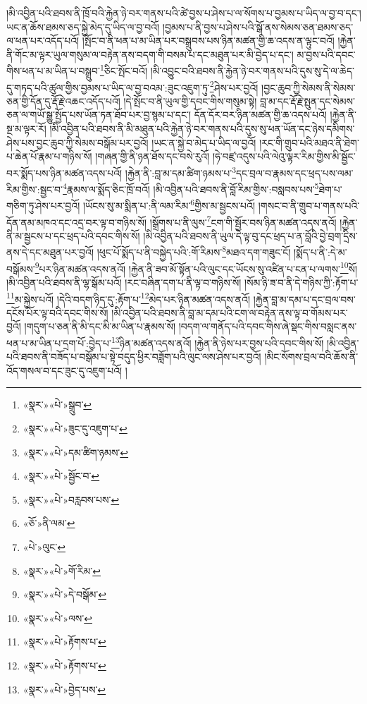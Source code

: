 །མི་འབྱིན་པའི་ཐབས་ནི་ཁྲོ་བའི་རྐྱེན་ཉེ་བར་གནས་པའི་ཚེ་བྱས་པ་ཤེས་པ་ལ་སོགས་པ་བྱམས་པ་ཡིད་ལ་བྱ་བ་དང་། ཡང་ན་ཆོས་ཐམས་ཅད་སྐྱེ་མེད་དུ་ཡིད་ལ་བྱ་བའོ། །བྱམས་པ་ནི་བྱས་པ་ཤེས་པའི་སྒོ་ནས་སེམས་ཅན་ཐམས་ཅད་ལ་ཕན་པར་འདོད་པའོ། །སྤོང་བ་ནི་ཕན་པ་མ་ཡིན་པར་བསྒྲུབས་པས་ཉིན་མཚན་གྱི་ཆ་འདས་ན་ལྟུང་བའོ། །རྐྱེན་ནི་གོང་མ་ལྟར་ཡུལ་གསུམ་ལ་བརྟེན་ནས་བདག་གི་བསམ་པ་དང་མཐུན་པར་མི་བྱེད་པ་དང་། མ་བྱས་པའི་དབང་གིས་ཕན་པ་མ་ཡིན་པ་བསྒྲུབ་\footnote{«སྣར་»«པེ་»སྒྲུབ་}ཅིང་སྤོང་བའོ། །མི་འབྱུང་བའི་ཐབས་ནི་རྐྱེན་ཉེ་བར་གནས་པའི་དུས་སུ་དེ་ལ་ཆེད་དུ་གཏད་པའི་ཚུལ་གྱིས་བྱམས་པ་ཡིད་ལ་བྱ་བའམ་:ཟུང་འཇུག་ཏུ་\footnote{«སྣར་»«པེ་»ཟུང་དུ་འཇུག་པ་}ཤེས་པར་བྱའོ། །བྱང་ཆུབ་ཀྱི་སེམས་ནི་སེམས་ཅན་གྱི་དོན་དུ་རྡོ་རྗེ་འཆང་འདོད་པའོ། །དེ་སྤོང་བ་ནི་ཡུལ་གྱི་དབང་གིས་གསུམ་སྟེ། བླ་མ་དང་རྡོ་རྗེ་སྤུན་དང་སེམས་ཅན་ལ་གཡོ་སྒྱུ་སྤྱོད་པས་ཡོན་ཏན་ཐོབ་པར་བྱ་སྙམ་པ་དང་། དོན་དོར་བར་ཉིན་མཚན་གྱི་ཆ་འདས་པའོ། །རྐྱེན་ནི་སྔ་མ་ལྟར་རོ། །མི་འབྱིན་པའི་ཐབས་ནི་མི་མཐུན་པའི་རྐྱེན་ཉེ་བར་གནས་པའི་དུས་སུ་ཕན་ཡོན་དང་ཉེས་དམིགས་ཤེས་པས་བྱང་ཆུབ་ཀྱི་སེམས་བསྒོམ་པར་བྱའོ། །ཡང་ན་སྐྱེ་བ་མེད་པ་ཡིད་ལ་བྱའོ། །རང་གི་གྲུབ་པའི་མཐའ་ནི་ཐེག་པ་ཆེན་པོ་རྣམ་པ་གཉིས་སོ། །གཞན་གྱི་ནི་ཉན་ཐོས་དང་བསེ་རུའོ། །ཧེ་བཛྲ་འདུས་པའི་ལེའུ་ལྟར་རིམ་གྱིས་མི་སྦྱོང་བར་སྨོད་པས་ཉིན་མཚན་འདས་པའོ། །རྐྱེན་ནི་:བླ་མ་དམ་ཚིག་ཉམས་པ་\footnote{«སྣར་»«པེ་»དམ་ཚིག་ཉམས་}དང་བྲལ་བ་རྣམས་དང་ཕྲད་པས་ལམ་རིམ་གྱིས་:སྦྱང་བ་\footnote{«སྣར་»«པེ་»སྦྱོང་བ་}རྣམས་ལ་སྨོད་ཅིང་ཁྲོ་བའོ། །མི་འབྱིན་པའི་ཐབས་ནི་བློ་རིམ་གྱིས་:བསླབས་པས་\footnote{«སྣར་»«པེ་»བརླབས་པས་}ཐེག་པ་གཅིག་ཏུ་ཤེས་པར་བྱའོ། །ཡོངས་སུ་མ་སྨིན་པ་:ནི་ལམ་རིམ་\footnote{«ཅོ་»ནི་ལམ་}གྱིས་མ་སྦྱངས་པའོ། །གསང་བ་ནི་གྲུབ་པ་གནས་པའི་དོན་ནམ་མཁའ་དང་འདྲ་བར་ལྟ་བ་གཉིས་སོ། །སྒྲོགས་པ་ནི་ལུས་\footnote{«པེ་»ལུང་}ངག་གི་སྦྱོར་བས་ཉིན་མཚན་འདས་ནའོ། །རྐྱེན་ནི་མ་སྦྱངས་པ་དང་ཕྲད་པའི་དབང་གིས་སོ། །མི་འབྱིན་པའི་ཐབས་ནི་ཡུལ་དེ་ལྟ་བུ་དང་ཕྲད་པ་ན་བློའི་བྱེ་བྲག་དྲིས་ནས་དེ་དང་མཐུན་པར་བྱའོ། །ཕུང་པོ་སྨོད་པ་ནི་བསྐྱེད་པའི་:གོ་རིམས་\footnote{«སྣར་»«པེ་»གོ་རིམ་}མཐའ་དག་གཟུང་ངོ། །སྨོད་པ་ནི་:དེ་མ་བསྒོམས་\footnote{«སྣར་»«པེ་»དེ་བསྒོམ་}པར་ཉིན་མཚན་འདས་ནའོ། །རྐྱེན་ནི་ཟབ་མོ་སྟོན་པའི་ལུང་དང་ཡོངས་སུ་འཛིན་པ་ངན་པ་ལགས་\footnote{«སྣར་»«པེ་»ལས་}སོ། །མི་འབྱིན་པའི་ཐབས་ནི་ལྷ་སྒོམ་པའོ། །རང་བཞིན་དག་པ་ནི་ལྟ་བ་གཉིས་སོ། །སོམ་ཉི་ཟ་བ་ནི་དེ་གཉིས་ཀྱི་:རྟོག་པ་\footnote{«སྣར་»«པེ་»རྟོགས་པ་}མ་སྐྱེས་པའོ། །དེའི་བདག་ཉིད་དུ་:རྟོག་པ་\footnote{«སྣར་»«པེ་»རྟོགས་པ་}མེད་པར་ཉིན་མཚན་འདས་ནའོ། །རྐྱེན་བླ་མ་དམ་པ་དང་བྲལ་བས་དངོས་པོར་ལྟ་བའི་དབང་གིས་སོ། །མི་འབྱིན་པའི་ཐབས་ནི་བླ་མ་དམ་པའི་ངག་ལ་བརྟེན་ནས་ལྟ་བ་གོམས་པར་བྱའོ། །གདུག་པ་ཅན་ནི་མི་དང་མི་མ་ཡིན་པ་རྣམས་སོ། །བདག་ལ་གནོད་པའི་དབང་གིས་ཞེ་སྡང་གིས་བསླང་ནས་ཕན་པ་མ་ཡིན་པ་དྲག་པོ་:བྱེད་པ་\footnote{«སྣར་»«པེ་»བྱེད་པས་}ཉིན་མཚན་འདས་ནའོ། །རྐྱེན་ནི་ཉེས་པར་བྱས་པའི་དབང་གིས་སོ། །མི་འབྱིན་པའི་ཐབས་ནི་བཟོད་པ་བསྒོམ་པ་སྟེ་བདུད་ཕྱིར་བཟློག་པའི་ལུང་ལས་ཤེས་པར་བྱའོ། །མིང་སོགས་བྲལ་བའི་ཆོས་ནི་འོད་གསལ་བ་དང་ཟུང་དུ་འཇུག་པའོ། །
